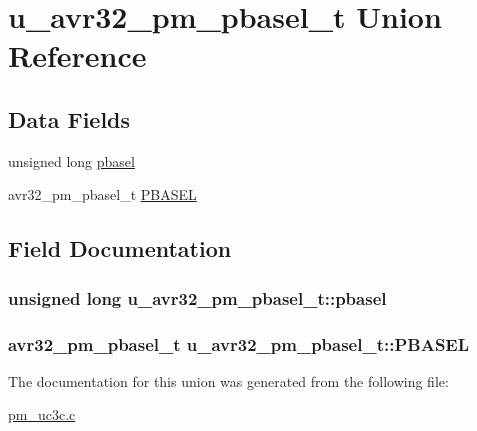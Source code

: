 \hypertarget{unionu__avr32__pm__pbasel__t}{
\section{u\-\_\-avr32\-\_\-pm\-\_\-pbasel\-\_\-t \-Union \-Reference}
\label{unionu__avr32__pm__pbasel__t}
}
\subsection*{\-Data \-Fields}
\begin{DoxyCompactItemize}
\item 
unsigned long \hyperlink{unionu__avr32__pm__pbasel__t_a15cd6c4d3e19089c6467605f778b3009}{pbasel}
\item 
avr32\-\_\-pm\-\_\-pbasel\-\_\-t \hyperlink{unionu__avr32__pm__pbasel__t_abc4093ae5512928e89d178137ac8293d}{\-P\-B\-A\-S\-E\-L}
\end{DoxyCompactItemize}


\subsection{\-Field \-Documentation}
\hypertarget{unionu__avr32__pm__pbasel__t_a15cd6c4d3e19089c6467605f778b3009}{
\subsubsection[{pbasel}]{\setlength{\rightskip}{0pt plus 5cm}unsigned long {\bf u\-\_\-avr32\-\_\-pm\-\_\-pbasel\-\_\-t\-::pbasel}}}
\label{unionu__avr32__pm__pbasel__t_a15cd6c4d3e19089c6467605f778b3009}
\hypertarget{unionu__avr32__pm__pbasel__t_abc4093ae5512928e89d178137ac8293d}{
\subsubsection[{\-P\-B\-A\-S\-E\-L}]{\setlength{\rightskip}{0pt plus 5cm}avr32\-\_\-pm\-\_\-pbasel\-\_\-t {\bf u\-\_\-avr32\-\_\-pm\-\_\-pbasel\-\_\-t\-::\-P\-B\-A\-S\-E\-L}}}
\label{unionu__avr32__pm__pbasel__t_abc4093ae5512928e89d178137ac8293d}


\-The documentation for this union was generated from the following file\-:\begin{DoxyCompactItemize}
\item 
\hyperlink{pm__uc3c_8c}{pm\-\_\-uc3c.\-c}\end{DoxyCompactItemize}
